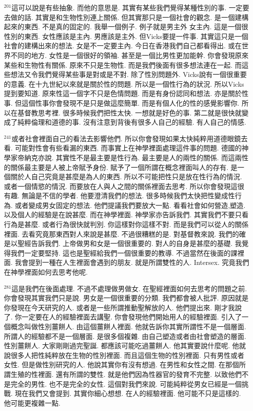 \documentclass{book}
\begin{document}
$^{201}$這可以說是有些抽象.
而他的意思是.
其實有某些我們覺得某種性別的事.
一定要去做的話.
其實是和生物性別連上關係.
但其實那只是一個社會的觀念.
是一個建構起來的東西.
不是真的固定的.
我舉一個例子.
例子就是男主外 女主內.
這是一個很性別的東西.
女性應該是主內.
男應該是主外.
但Vicks要提一件事.
其實這只是一個社會的建構出來的想法.
女是不一定要主內.
今日在香港我們自己都看得出.
或在世界不同的地方.
女性是一個很好的領袖.
甚至是一個比男性更加能幹.
你會發現原來某些和生物性有關係.
原來不只是生物性.
而是我們後面有很多想法連在一起.
而這些想法又令我們覺得某些事是對或是不對.
除了性別問題外.
Vicks說有一個很重要的意義.
在十九世紀以來就是關於性的問題.
所以是一個性行為的狀況.
所以Vicks提到要知道.
原來性這一個字不只是色情問題.
而是有身份認同和想法.
亦是關於性事.
但這個性事你會發現不是只是做這麼簡單.
而是有個人化的性的感覺影響你.
所以在基督教思考裡.
很多時候我們把性太快.
一想就是好色的事.
第二就是很快就變成了純粹倫理和道德的事.
沒有注意到背後有很多人自己的經驗.
有人自己的情感.

$^{241}$或者社會裡面自己的看法去影響他們.
所以你會發現如果太快純粹用道德眼鏡去看.
可能對性會有些看漏的東西.
而事實上在神學裡面處理這件事的問題.
德國的神學家帝納克亦說.
其實性不是最主要是性行為.
最主要是人的兩性的關係.
而這兩性的關係最主要是人被上帝賦予身份.
賦予了一個所謂在概念裡面叫人的存有.
是一個關於人自己究竟是甚麼是為人的東西.
所以不可能把性只是放在性行為的情況.
或者一個情慾的情況.
而要放在人與人之間的關係裡面去思考.
所以你會發現這很有趣.
無論是不信的學者.
他要澄清我們的想法.
很多時候我們太快把性變成性行為.
或者變成男女固定的想法.
他們提議我們要放大一點.
看看社會如何營造,塑造.
以及個人的經驗是在說甚麼.
而在神學裡面.
神學家亦告訴我們.
其實我們不要只看行為是甚麼.
或者行為很快就判別.
你這樣對你這樣不對.
而是我們可以從人的關係裡面.
去看究竟那東西對人來說是甚麼.
不過很糟糕的是.
對基督教來說.
我們的確是以聖經告訴我們.
上帝做男和女是一個很重要的.
對人的自身是甚麼的基礎.
我覺得我們一定要堅持.
這也是聖經給我們一個很重要的教導.
不過當然在後面的課裡面.
我會提到一種在人生裡面會遇到的朋友.
就是所謂雙性的人.
Intersex.
究竟我們在神學裡面如何去思考他呢.

$^{281}$這是我們在後面處理.
不過不處理做男做女.
在聖經裡面如何去思考的問題之前.
你會發現其實我們只是說.
男女是一個很重要的分類.
我們都會被人批評.
原因就是你發現在今天研究的人.
或者是一些所謂推動聖解放的人.
他們提出來.
剛才我說了.
你一定要在人的經驗裡面去講聖.
你會發現他們開始用人的經驗裡面.
引入了一個概念叫做性別薑餅人.
由這個薑餅人裡面.
他就告訴你其實所謂性不是一個層面.
所謂人的經驗都不是一個層面.
是很多個複雜.
由自己塑造或者由社會塑造的層面.
性別薑餅人.
大家剛剛過完聖誕.
都應該可能吃過薑餅人.
他其實要說什麼呢.
他就說很多人把性純粹放在生物的性別裡面.
而且這個生物的性別裡面.
只有男性或者女性.
但是做性別研究的人.
他說其實你有沒有想過.
在男性和女性之間.
在那個所謂生殖的性裡面.
還有所謂的雙性.
就是他們因為性器官的發育不完整.
以致他們不是完全的男性.
也不是完全的女性.
這個對我們來說.
可能純粹從男女已經是一個挑戰.
現在我們又會提到.
其實你細心想想.
在人的經驗裡面.
他可能不只是這樣的.
他可能更複雜一點.
\end{document}
